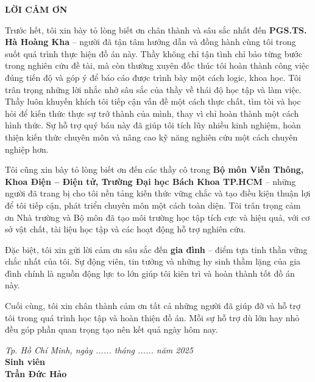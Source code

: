 \thispagestyle{empty}
\begin{center}
    \vspace*{1.5cm}
    \textbf{\fontsize{16}{19}\selectfont LỜI CẢM ƠN}
    \vspace{0.8cm}
\end{center}

\noindent
\setlength{\parindent}{1.5cm}
\setlength{\parskip}{6pt}
\fontsize{12}{14}\selectfont  

Trước hết, tôi xin bày tỏ lòng biết ơn chân thành và sâu sắc nhất đến \textbf{PGS.TS. Hà Hoàng Kha} – người đã tận tâm hướng dẫn và đồng hành cùng tôi trong suốt quá trình thực hiện đồ án này. Thầy không chỉ tận tình chỉ bảo từng bước trong nghiên cứu đề tài, mà còn thường xuyên đốc thúc tôi hoàn thành công việc đúng tiến độ và góp ý để báo cáo được trình bày một cách logic, khoa học. Tôi trân trọng những lời nhắc nhở sâu sắc của thầy về thái độ học tập và làm việc. Thầy luôn khuyến khích tôi tiếp cận vấn đề một cách thực chất, tìm tòi và học hỏi để kiến thức thực sự trở thành của mình, thay vì chỉ hoàn thành một cách hình thức. Sự hỗ trợ quý báu này đã giúp tôi tích lũy nhiều kinh nghiệm, hoàn thiện kiến thức chuyên môn và nâng cao kỹ năng nghiên cứu một cách chuyên nghiệp hơn.

Tôi cũng xin bày tỏ lòng biết ơn đến các thầy cô trong \textbf{Bộ môn Viễn Thông, Khoa Điện – Điện tử, Trường Đại học Bách Khoa TP.HCM} – những người đã trang bị cho tôi nền tảng kiến thức vững chắc và tạo điều kiện thuận lợi để tôi tiếp cận, phát triển chuyên môn một cách toàn diện. Tôi trân trọng cảm ơn Nhà trường và Bộ môn đã tạo môi trường học tập tích cực và hiệu quả, với cơ sở vật chất, tài liệu học tập và các hoạt động hỗ trợ nghiên cứu.

Đặc biệt, tôi xin gửi lời cảm ơn sâu sắc đến \textbf{gia đình} – điểm tựa tinh thần vững chắc nhất của tôi. Sự động viên, tin tưởng và những hy sinh thầm lặng của gia đình chính là nguồn động lực to lớn giúp tôi kiên trì và hoàn thành tốt đồ án này.

Cuối cùng, tôi xin chân thành cảm ơn tất cả những người đã giúp đỡ và hỗ trợ tôi trong quá trình học tập và hoàn thiện đồ án. Mỗi sự hỗ trợ dù lớn hay nhỏ đều góp phần quan trọng tạo nên kết quả ngày hôm nay.

\vspace{0.8cm}
\begin{flushright}
    \begin{minipage}{0.5\textwidth}
        \centering
        \textit{Tp. Hồ Chí Minh, ngày ...... tháng ...... năm 2025} \\
        \vspace{0.8cm}
        \textbf{Sinh viên} \\
        \vspace{0.3cm}
        \textbf{Trần Đức Hảo}
    \end{minipage}
\end{flushright}

\vfill
\newpage
